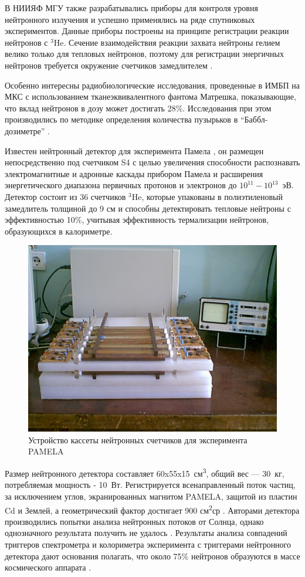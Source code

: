  В НИИЯФ МГУ также разрабатывались приборы для контроля уровня нейтронного излучения \cite{Shavrin1990} и успешно применялись на ряде спутниковых экспериментов. Данные приборы построены на принципе регистрации реакции нейтронов с $ ^{3}$He. Сечение взаимодействия реакции захвата нейтроны гелием велико только для тепловых нейтронов, поэтому для регистрации энергичных нейтронов требуется окружение счетчиков замедлителем \cite{Shavrin2002}.

Особенно интересны радиобиологические исследования, проведенные в ИМБП \cite{Shurshakov2016} на МКС с использованием тканеэквивалентного фантома Матрешка, показывающие, что вклад нейтронов в дозу может достигать 28\%.  Исследования при этом производились по методике определения количества пузырьков в ``Баббл-дозиметре'' \cite{hulapko2016}.


Известен нейтронный детектор для эксперимента Памела \cite{Menn2013}, он размещен непосредственно под счетчиком S4 с целью увеличения способности распознавать электромагнитные и адронные каскады прибором Памела и расширения энергетического диапазона первичных протонов и электронов до $ 10^{11}-10^{13} $~эВ. Детектор состоит из 36 счетчиков  $^3$He, которые упакованы в полиэтиленовый замедлитель толщиной до 9 см и способны детектировать тепловые нейтроны с эффективностью 10\%, учитывая эффективность термализации нейтронов, образующихся в калориметре.

\begin{figure}
	\centering
	\includegraphics[width=0.7\linewidth]{images/neutrons/pamela}
	\caption{Устройство кассеты нейтронных счетчиков для эксперимента PAMELA \cite{Stozhkov2007}}
	\label{fig:pamela}
\end{figure}

Размер нейтронного детектора составляет 60x55x15~см\textsuperscript{3}, общий вес --- 30~кг, потребляемая мощность - 10~Вт. Регистрируется всенаправленный поток частиц, за исключением углов, экранированных магнитом PAMELA, защитой из пластин Cd и Землей, а геометрический фактор достигает 900 см\textsuperscript{2}ср \cite{Stozhkov2007}. Авторами детектора производились попытки анализа нейтронных потоков от Солнца, однако однозначного результата получить не удалось \cite{Goryacheva2016}. Результаты анализа совпадений триггеров спектрометра и колориметра эксперимента с триггерами нейтронного детектора дают основания полагать, что около 75\% нейтронов образуются в массе космического аппарата \cite{Stozhkov2007}.

